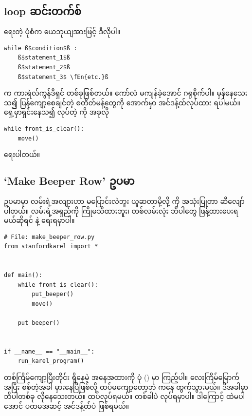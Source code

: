\subsection*{ loop ဆင်းတက်စ်}
  ရေးတဲ့ ပုံစံက ယေဘုယျအားဖြင့် ဒီလိုပါ။ 
%
\setlength{\fboxsep}{0pt}
\begin{verbatim}
while ß$condition$ß :
    ß$statement_1$ß
    ß$statement_2$ß
    ß$statement_3$ \fEn{etc.}ß
\end{verbatim}
%
 က ကားရဲလ်ကွန်ဒီရှင် တစ်ခုဖြစ်တယ်။ ကော်လံ \fCode{:} မကျန်ခဲ့အောင် ဂရုစိုက်ပါ။  မှန်နေသေးသ၍ ပြန်ကျော့စေချင်တဲ့ စတိတ်မန့်တွေကို  အောက်မှာ အင်ဒန့်ထ်လုပ်ထား ရပါမယ်။ ရှေ့မှာရှင်းနေသ၍  လုပ်တဲ့   ကို အခုလို
%
\setlength{\fboxsep}{0pt}
\begin{verbatim}
while front_is_clear():
    move()
\end{verbatim}
%
ရေးပါတယ်။

\subsection*{‘Make Beeper Row’ ဥပမာ}
 ဥပမာမှာ လမ်းရဲ့အလျားဟာ မပြောင်းလဲဘူး ယူဆတာမို့လို့    ကို အသုံးပြုတာ ဆီလျော်ပါတယ်။ လမ်းရဲ့အရှည်ကို ကြိုမသိထားဘူး၊ တစ်လမ်းလုံး ဘိပါတွေ ဖြန့်ထားပေးရမယ်ဆိုရင်  နဲ့ ရေးရမှာပါ။
%
\setlength{\fboxsep}{0pt}
\begin{verbatim}
# File: make_beeper_row.py
from stanfordkarel import *


def main():
    while front_is_clear():
        put_beeper()
        move()

    put_beeper()


if __name__ == "__main__":
    run_karel_program()

\end{verbatim}
%

တစ်ကြိမ်ကျော့ပြီးတိုင်း  ရှိနေမဲ့ အနေအထားကို ပုံ (\fRefNo{\ref{fig:mbr_iters}}) မှာ ကြည့်ပါ။ လေးကြိမ်မြောက်အပြီး  စစ်တဲ့အခါ မှားနေပြီဖြစ်လို့ ထပ်မကျော့တော့ဘဲ  ကနေ ထွက်သွားမယ်။ ဒီအခါမှာ ဘိပါတစ်ခု လိုနေသေးတယ်။  ထပ်လုပ်ရမယ်။ တစ်ခါပဲ လုပ်ရမှာပါ။ ဒါကြောင့်   ထဲမပါအောင် ပထမအဆင့် အင်ဒန့်ထ်ပဲ ဖြစ်ရမယ်။ 


